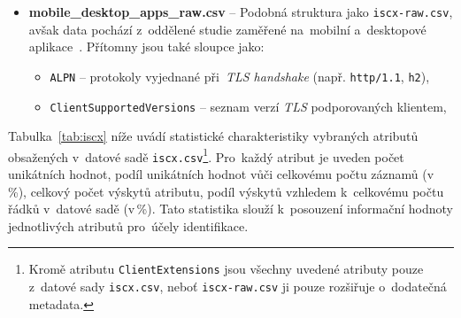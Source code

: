 \begin{itemize}
	\item \textbf{mobile\_desktop\_apps\_raw.csv} -- Podobná struktura jako \texttt{iscx-raw.csv}, avšak data pochází z~oddělené studie zaměřené na~mobilní a~desktopové aplikace~\cite{MatousekMobileDevice2020}. 
	      Přítomny jsou také sloupce jako:
	      \begin{itemize}
	      	\item \texttt{ALPN} -- protokoly vyjednané při~\textit{TLS handshake} (např. \texttt{http/1.1}, \texttt{h2}),
	      	\item \texttt{ClientSupportedVersions} -- seznam verzí \textit{TLS} podporovaných klientem,
	      \end{itemize}
\end{itemize}
Tabulka~\ref{tab:iscx} níže uvádí statistické charakteristiky vybraných atributů obsažených v~datové sadě \texttt{iscx.csv}\footnote{Kromě atributu \texttt{ClientExtensions} jsou všechny uvedené atributy pouze z~datové sady \texttt{iscx.csv}, neboť \texttt{iscx-raw.csv} ji pouze rozšiřuje o~dodatečná metadata.}. Pro~každý atribut je uveden počet unikátních hodnot, podíl unikátních hodnot vůči celkovému počtu záznamů (v\,\%), celkový počet výskytů atributu, podíl výskytů vzhledem k~celkovému počtu řádků v~datové sadě (v\,\%). Tato statistika slouží k~posouzení informační hodnoty jednotlivých atributů pro~účely identifikace.
